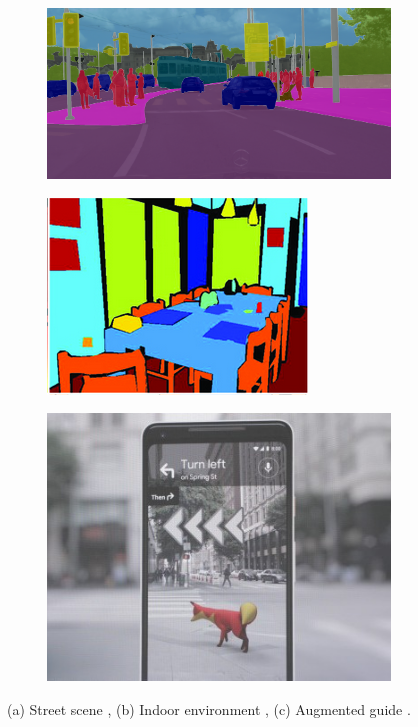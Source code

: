	\begin{figure}[h]
		\centering
		\begin{subfigure}{.3\textwidth}
			\centering
			\includegraphics[width=.95\linewidth]{images/auto_driving}
			\caption{}
			\label{Fig:appauto}
		\end{subfigure}
		\begin{subfigure}{.3\textwidth}
			\centering
			\includegraphics[width=.8\linewidth]{images/indoor}
			\caption{}
			\label{Fig:approbo}
		\end{subfigure}
		\begin{subfigure}{.3\textwidth}
			\centering
			\includegraphics[width=.8\linewidth]{images/vr_dog}
			\caption{}
			\label{Fig:appaug}
		\end{subfigure}
		\caption{(a) Street scene \cite{cityscapes}, (b) Indoor environment \cite{indoor}, (c) Augmented guide \cite{techcrunch}.}
		\label{Fig:app}
	\end{figure}


